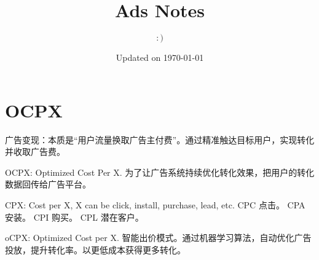 \documentclass{article}
\title{Ads Notes}
\author{$:)$}
\date{Updated on \today}
\begin{document}
\maketitle
\section{OCPX}
广告变现：本质是“用户流量换取广告主付费”。通过精准触达目标用户，实现转化并收取广告费。

OCPX: Optimized Cost Per X. 为了让广告系统持续优化转化效果，把用户的转化数据回传给广告平台。

CPX: Cost per X, X can be click, install, purchase, lead, etc. CPC 点击。 CPA 安装。 CPI 购买。 CPL 潜在客户。

oCPX: Optimized Cost per X. 智能出价模式。通过机器学习算法，自动优化广告投放，提升转化率。以更低成本获得更多转化。
\end{document}

